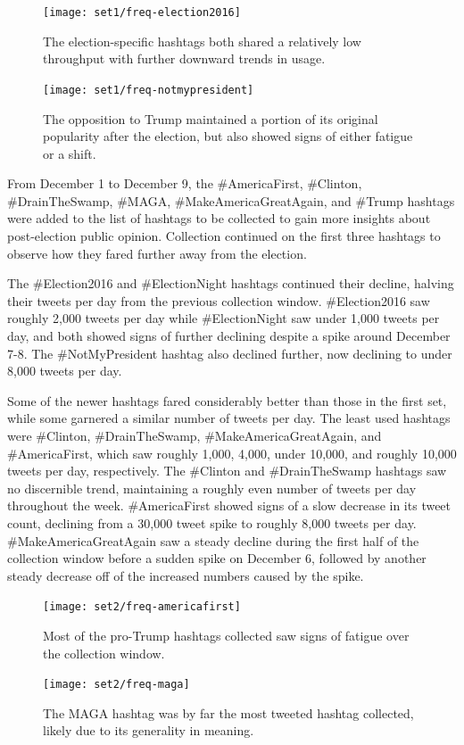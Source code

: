 \documentclass[prodmode]{acmsmall} %
\begin{document}
\begin{figure}
\centering
\begin{minipage}[b]{.49\textwidth}
    \texttt{[image: set1/freq-election2016]}
\caption{The election-specific hashtags both shared a relatively low throughput
  with further downward trends in usage.}\label{election chart}
\end{minipage}\hfill
\begin{minipage}[b]{.49\textwidth}
    \texttt{[image: set1/freq-notmypresident]}
\caption{The opposition to Trump maintained a portion of its original popularity
  after the election, but also showed signs of either fatigue or a shift.}
\label{notmypresident chart}
\end{minipage}
\end{figure}

From December 1 to December 9, the \#AmericaFirst, \#Clinton, \#DrainTheSwamp,
\#MAGA, \#MakeAmericaGreatAgain, and \#Trump hashtags were added to the list of
hashtags to be collected to gain more insights about post-election public
opinion. Collection continued on the first three hashtags to observe how they
fared further away from the election.

The \#Election2016 and \#ElectionNight hashtags continued their decline, halving
their tweets per day from the previous collection window. \#Election2016 saw
roughly 2,000 tweets per day while \#ElectionNight saw under 1,000 tweets per
day, and both showed signs of further declining despite a spike around December
7-8. The \#NotMyPresident hashtag also declined further, now declining to under
8,000 tweets per day.

Some of the newer hashtags fared considerably better than those in the first
set, while some garnered a similar number of tweets per day. The least used
hashtags were \#Clinton, \#DrainTheSwamp, \#MakeAmericaGreatAgain, and
\#AmericaFirst, which saw roughly 1,000, 4,000, under 10,000, and roughly 10,000
tweets per day, respectively. The \#Clinton and \#DrainTheSwamp hashtags saw no
discernible trend, maintaining a roughly even number of tweets per day
throughout the week. \#AmericaFirst showed signs of a slow decrease in its tweet
count, declining from a 30,000 tweet spike to roughly 8,000 tweets per day.
\#MakeAmericaGreatAgain saw a steady decline during the first half of the
collection window before a sudden spike on December 6, followed by another
steady decrease off of the increased numbers caused by the spike.

\begin{figure}
\centering
\begin{minipage}[b]{.49\textwidth}
    \texttt{[image: set2/freq-americafirst]}
\caption{Most of the pro-Trump hashtags collected saw signs of fatigue over the
  collection window.}\label{americafirst chart}
\end{minipage}\hfill
\begin{minipage}[b]{.49\textwidth}
    \texttt{[image: set2/freq-maga]}
\caption{The MAGA hashtag was by far the most tweeted hashtag collected,
  likely due to its generality in meaning.}
\label{maga chart}
\end{minipage}
\end{figure}
\end{document}
